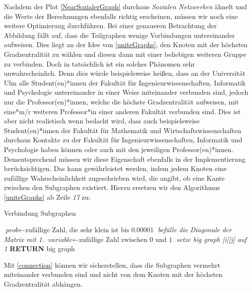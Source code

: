 \newpage
Nachdem der Plot \ref{NearSozialerGraph} durchaus \textit{Sozialen Netzwerken} ähnelt und die Werte der Berechnungen ebenfalls richtig erscheinen, müssen wir noch eine weitere Optimierung durchführen. Bei einer genaueren Betrachtung der Abbildung fällt auf, dass die Teilgraphen wenige Verbindungen untereinander aufweisen. Dies liegt an der Idee von \ref{uniteGraphs}, den Knoten mit der höchsten Gradzentralität zu wählen und diesen dann mit einer beliebigen weiteren Gruppe zu verbinden. Doch in tatsächlich ist ein solches Phänomen sehr unwahrscheinlich. Denn dies würde beispielsweise heißen, dass an der Universität Ulm alle Student(en)*innen der Fakultät für Ingenieurwissenschaften, Informatik und Psychologie untereinander in einer Weise miteinander verbunden sind, jedoch nur die Professor(en)*innen, welche die höchste Gradzentralität aufweisen, mit eine*m/r weiteren Professor*in einer anderen Fakultät verbunden sind. Dies ist aber nicht realistisch wenn bedacht wird, dass auch beispielsweise Student(en)*innen der Fakultät für Mathematik und Wirtschaftswissenschaften durchaus Kontakte zu der Fakultät für Ingenieurwissenschaften, Informatik und Psychologie haben können oder auch mit den jeweiligen Professor(en)*innen. Dementsprechend müssen wir diese Eigenschaft ebenfalls in der Implementierung berücksichtigen. Das kann gewährleistet werden, indem jedem Knoten eine zufällige Wahrscheinlichkeit zugeschrieben wird, die angibt, ob eine Kante zwischen den Subgraphen existiert. Hierzu ersetzen wir den Algorithmus \ref{uniteGraphs} ab Zeile \textit{17} zu:

\begin{algorithm}
\caption{Verbindung Subgraphen}\label{connection}
\begin{algorithmic}[1]
\State $\textit{prob} \gets \text{zufällige Zahl, die sehr klein ist bis 0.00001}$
\State \textit{befülle die Diagonale der Matrix mit 1}.
\EndFor
{}
\State $\textit{variable} \gets \text{zufällige Zahl zwischen 0 und 1}$
\State \textit{setze big graph [i][j] auf 1}
\EndIf
\EndFor
\EndFor
\textbf{RETURN} big graph
\EndProcedure
\end{algorithmic}
\end{algorithm}

Mit \ref{connection} können wir sicherstellen, dass die Subgraphen vermehrt miteinander verbunden sind und nicht von dem Knoten mit der höchsten Gradzentralität abhängen.

